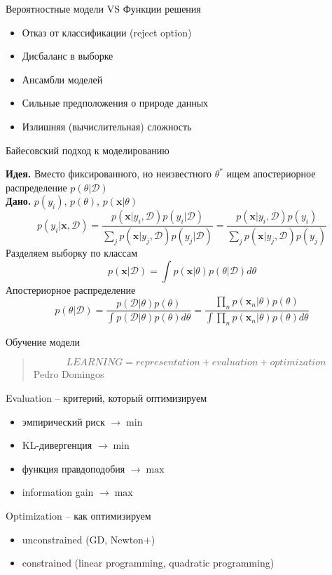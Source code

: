 \documentclass[10pt]{beamer}
\begin{document}
\begin{frame}{Вероятностные модели VS Функции решения}

\begin{itemize}
\item[\color{green}\ding{108}] Отказ от классификации (reject option)
\item[\color{green}\ding{108}] Дисбаланс в выборке
\item[\color{green}\ding{108}] Ансамбли моделей
\item[\color{red}\ding{108}] Сильные предположения о природе данных
\item[\color{red}\ding{108}] Излишняя (вычислительная) сложность
\end{itemize}

\end{frame}

\begin{frame}{Байесовский подход к моделированию}

{\bf Идея.} Вместо фиксированного, но неизвестного $\theta^*$ ищем апостериорное распределение $p(\theta | \mathcal{D})$\\ 
{\bf Дано.} $p(y_i)$, $p(\theta)$, $p(\mathbf{x} | \theta)$ 
\[
p(y_i | \mathbf{x}, \mathcal{D})= \frac{p(\mathbf{x} | y_i, \mathcal{D}) p(y_i | \mathcal{D})}{\sum_jp(\mathbf{x} | y_j, \mathcal{D}) p(y_j | \mathcal{D})} = \frac{p(\mathbf{x} | y_i, \mathcal{D}) p(y_i)}{\sum_jp(\mathbf{x} | y_j, \mathcal{D}) p(y_j)}
\]
Разделяем выборку по классам
\[
p(\mathbf{x} | \mathcal{D}) = \int p(\mathbf{x} | \theta) p(\theta | \mathcal{D}) d\theta
\]
Апостериорное распределение
\[
p(\theta | \mathcal{D}) = \frac{p(\mathcal{D} | \theta) p(\theta)}{\int p(\mathcal{D} | \theta) p(\theta) d\theta} = \frac{\prod_n p(\mathbf{x}_n | \theta) p(\theta)}{\int \prod_n p(\mathbf{x}_n | \theta) p(\theta) d\theta}
\]

\end{frame}

\begin{frame}{Обучение модели}

\begin{quote}
\[
LEARNING = representation + evaluation + optimization
\]
\hfill Pedro Domingos
\end{quote}

Evaluation -- критерий, который оптимизируем
\begin{itemize}
\item эмпирический риск $\rightarrow \min$
\item KL-дивергенция $\rightarrow \min$
\item функция правдоподобия $\rightarrow \max$
\item information gain $\rightarrow \max$
\end{itemize}
Optimization -- как оптимизируем
\begin{itemize}
\item unconstrained (GD, Newton+)
\item constrained (linear programming, quadratic programming)
\end{itemize}

\end{frame}
\end{document}
